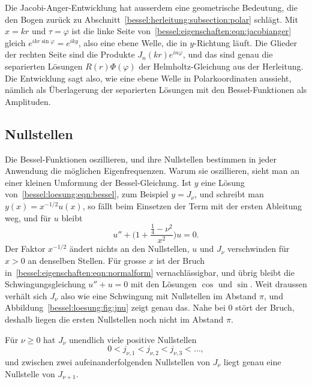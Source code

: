 Die Jacobi-Anger-Entwicklung hat ausserdem eine geometrische Bedeutung, die den Bogen zurück zu Abschnitt~\ref{bessel:herleitung:subsection:polar} schlägt.
Mit $x=kr$ und $\tau=\varphi$ ist die linke Seite von~\eqref{bessel:eigenschaften:eqn:jacobianger} gleich $e^{ikr\sin\varphi}=e^{iky}$, also eine ebene Welle, die in $y$-Richtung läuft.
Die Glieder der rechten Seite sind die Produkte $J_n(kr)e^{in\varphi}$, und das sind genau die separierten Lösungen $R(r)\Phi(\varphi)$ der Helmholtz-Gleichung aus der Herleitung.
Die Entwicklung sagt also, wie eine ebene Welle in Polarkoordinaten aussieht, nämlich als Überlagerung der separierten Lösungen mit den Bessel-Funktionen als Amplituden.

%
%
\subsection{Nullstellen
\label{bessel:eigenschaften:subsection:nullstellen}}
Die Bessel-Funktionen oszillieren, und ihre Nullstellen bestimmen in jeder Anwendung die möglichen Eigenfrequenzen.
%
%
Warum sie oszillieren, sieht man an einer kleinen Umformung der Bessel-Gleichung.
Ist $y$ eine Lösung von~\eqref{bessel:loesung:eqn:bessel}, zum Beispiel $y=J_\nu$, und schreibt man $y(x)=x^{-1/2}u(x)$, so fällt beim Einsetzen der Term mit der ersten Ableitung weg, und für $u$ bleibt
\begin{equation}
u''
+
\Biggl(
1
+
\frac{\frac14-\nu^2}{x^2}
\Biggr)
u
=
0.
\label{bessel:eigenschaften:eqn:normalform}
\end{equation}
Der Faktor $x^{-1/2}$ ändert nichts an den Nullstellen, $u$ und $J_\nu$ verschwinden für $x>0$ an denselben Stellen.
Für grosse $x$ ist der Bruch in~\eqref{bessel:eigenschaften:eqn:normalform} vernachlässigbar, und übrig bleibt die Schwingungsgleichung $u''+u=0$ mit den Lösungen $\cos$ und $\sin$.
Weit draussen verhält sich $J_\nu$ also wie eine Schwingung mit Nullstellen im Abstand $\pi$, und Abbildung~\ref{bessel:loesung:fig:jnu} zeigt genau das.
Nahe bei $0$ stört der Bruch, deshalb liegen die ersten Nullstellen noch nicht im Abstand $\pi$.

\begin{satz}
\label{bessel:eigenschaften:satz:nullstellen}
Für $\nu\ge 0$ hat $J_\nu$ unendlich viele positive Nullstellen
\[
0 < j_{\nu,1} < j_{\nu,2} < j_{\nu,3} < \dots,
\]
und zwischen zwei aufeinanderfolgenden Nullstellen von $J_\nu$ liegt genau eine Nullstelle von $J_{\nu+1}$.
\end{satz}

